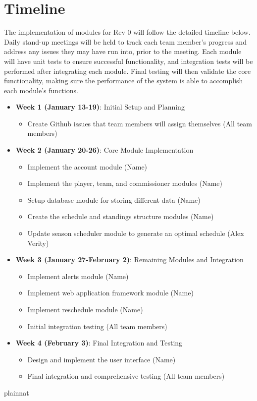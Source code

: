\documentclass[12pt, titlepage]{article}
\begin{document}

\section{Timeline}

The implementation of modules for Rev 0 will follow the detailed timeline below.
Daily stand-up meetings will be held to track each team member's progress and address
any issues they may have run into, prior to the meeting. Each module will have unit
tests to ensure successful functionality, and integration tests will be performed
after integrating each module. Final testing will then validate the core functionality,
making sure the performance of the system is able to accomplish each module's functions.

\begin{itemize}
  \item \textbf{Week 1 (January 13-19)}: Initial Setup and Planning
    \begin{itemize}
      \item Create Github issues that team members will assign themselves
      (All team members)
    \end{itemize}
  \item \textbf{Week 2 (January 20-26)}: Core Module Implementation
    \begin{itemize}
      \item Implement the account module (Name)
      \item Implement the player, team, and commissioner modules (Name)
      \item Setup database module for storing different data (Name)
      \item Create the schedule and standings structure modules (Name)
      \item Update season scheduler module to generate an optimal schedule (Alex Verity)
    \end{itemize}
  \item \textbf{Week 3 (January 27-February 2)}: Remaining Modules and Integration
    \begin{itemize}
      \item Implement alerts module (Name)
      \item Implement web application framework module (Name)
      \item Implement reschedule module (Name)
      \item Initial integration testing (All team members)
    \end{itemize}
  \item \textbf{Week 4 (February 3)}: Final Integration and Testing
    \begin{itemize}
      \item Design and implement the user interface (Name)
      \item Final integration and comprehensive testing (All team members)
    \end{itemize}
\end{itemize}



 {plainnat}


\newpage{}
\end{document}
